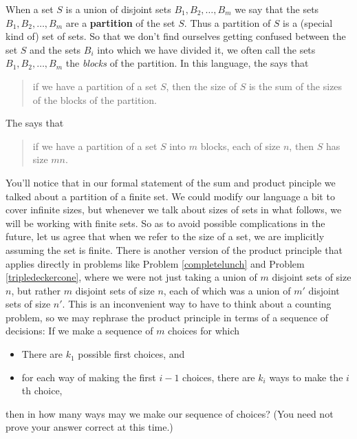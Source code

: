When a set $S$ is a union of disjoint sets $B_1, B_2, \ldots, B_m$ we say
that the sets $B_1, B_2, \ldots, B_m$ are a {\bf
partition} of the set
$S$.  Thus a partition of $S$ is a (special kind of) set of sets.  So that
we don't find ourselves getting confused between the set $S$ and the sets
$B_i$ into which we have divided it, we often call the sets $B_1, B_2,
\ldots, B_m$ the {\em blocks} of the partition.  In this language, the
 says that 
\begin{quote}if we have a partition of a set $S$, then the size of $S$ is the
sum of the sizes of the blocks of the partition.\end{quote}  The
 says
that
\begin{quote}if we have a partition of a set $S$ into $m$ blocks, each
  of size $n$, then $S$ has size $mn$.\end{quote} You'll notice that
in our formal statement of the sum and product pinciple we talked
about a partition of a finite set. We could modify our language a bit
to cover infinite sizes, but whenever we talk about sizes of sets in
what follows, we will be working with finite sets. So as to avoid
possible complications in the future, let us agree that when we refer
to the size of a set, we are implicitly assuming the set is
finite. There is another version of the product principle that applies
directly in problems like Problem \ref{completelunch} and Problem
\ref{tripledeckercone}, where we were not just taking a union of $m$
disjoint sets of size $n$, but rather $m$ disjoint sets of size $n$,
each of which was a union of $m'$ disjoint sets of size $n'$.  This is
an inconvenient way to have to think about a counting problem, so we
may rephrase the product principle in terms of a sequence of
decisions: \bp \iteme If we make a sequence of $m$ choices for
which\label{generalproductprincipleintro}
\begin{itemize} 
\item There are $k_1$ possible first choices, and
\item for each way of making the first $i-1$ choices, there are $k_i$ ways to
make the $i$th choice,
\end{itemize}
then in how many ways may we
make our sequence of choices?  (You need not prove your answer correct at
this time.)
\ep
 
